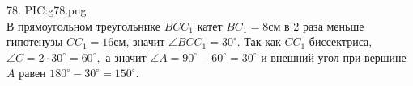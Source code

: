 78. {{PIC:g78.png}}\\
В прямоугольном треугольнике $BCC_1$ катет $BC_1=8$см в 2 раза меньше гипотенузы $CC_1=16$см, значит $\angle BCC_1=30^\circ.$ Так как $CC_1$ биссектриса, $\angle C=2\cdot30^\circ=60^\circ,$ а значит $\angle A=90^\circ-60^\circ=30^\circ$ и внешний угол при вершине $A$ равен $180^\circ-30^\circ=150^\circ.$\\
